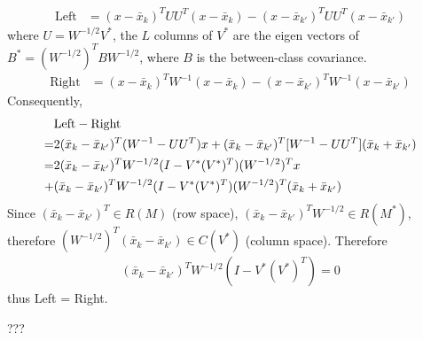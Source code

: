\begin{exercise}
  \begin{exerciseSection}
    \begin{align}
      \mbox{Left} &= (x -\bar{x}_k)^TUU^T(x -\bar{x}_k) - (x
      -\bar{x}_{k'})^TUU^T(x -\bar{x}_{k'}) 
    \end{align}
    where $U=W^{-1/2}V^*$, the $L$ columns of $V^*$ are the eigen vectors of
    $B^* = (W^{-1/2})^TBW^{-1/2}$, where $B$ is the between-class covariance.
    \begin{align}
      \mbox{Right} &= (x -\bar{x}_k)^TW^{-1}(x -\bar{x}_k) - (x
      -\bar{x}_{k'})^TW^{-1}(x -\bar{x}_{k'}) 
    \end{align}
    Consequently,
    \begin{align}
      & \mbox{Left} - \mbox{Right} \notag \\
      = & 2(\bar{x}_k - \bar{x}_{k'})^T(W^{-1} - UU^T)x + (\bar{x}_k -
      \bar{x}_{k'})^T[W^{-1}-UU^T](\bar{x}_k + \bar{x}_{k'})\\
      = & 2(\bar{x}_k - \bar{x}_{k'})^TW^{-1/2}(I - V^*(V^*)^T)(W^{-1/2})^Tx
      \notag\\ 
      + & (\bar{x}_k - \bar{x}_{k'})^TW^{-1/2}(I -
      V^*(V^*)^T)(W^{-1/2})^T(\bar{x}_k + \bar{x}_{k'})
    \end{align}
    Since $(\bar{x}_k -\bar{x}_{k'})^T\in R(M)$ (row space), $(\bar{x}_k
    -\bar{x}_{k'})^TW^{-1/2}\in R(M^*)$, therefore $(W^{-1/2})^T(\bar{x}_k
    -\bar{x}_{k'}) \in C(V^*)$  (column space). Therefore
    \begin{align}
      (\bar{x}_k -\bar{x}_{k'})^TW^{-1/2}(I - V^*(V^*)^T) = 0
    \end{align}
    thus Left = Right.
  \end{exerciseSection}
  
  \begin{exerciseSection}
    ???
  \end{exerciseSection}
\end{exercise}

\begin{exercise}[(Program)]
\end{exercise}

